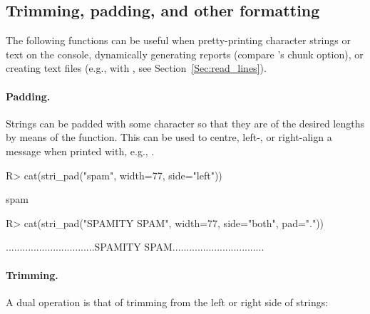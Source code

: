 \documentclass[nojss]{jss}
\begin{document}



\subsection{Trimming, padding, and other formatting}

The following functions can be useful when pretty-printing
character strings or text on the console,
dynamically generating reports (compare 's
 chunk option), or creating text files
(e.g., with , see Section~\ref{Sec:read_lines}).



\paragraph{Padding.}
Strings can be padded with some character so that they are of the desired
lengths by means of the  function.
This can be used to centre, left-, or right-align a message
when printed with, e.g.,  .


\begin{Schunk}
\begin{Sinput}
R> cat(stri_pad("spam", width=77, side="left"))
\end{Sinput}
\begin{Soutput}
                                                                         spam
\end{Soutput}
\begin{Sinput}
R> cat(stri_pad("SPAMITY SPAM", width=77, side="both", pad="."))
\end{Sinput}
\begin{Soutput}
................................SPAMITY SPAM.................................
\end{Soutput}
\end{Schunk}







\paragraph{Trimming.}
A dual operation is that of trimming from the left or right side
of strings:
\end{document}
